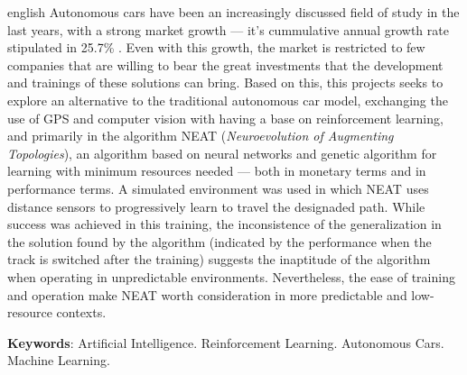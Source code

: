 \begin{resumo}[Abstract]
	\begin{otherlanguage*}{english}
		Autonomous cars have been an increasingly discussed field of study in
		the last years, with a strong market growth — it's cummulative annual
		growth rate stipulated in 25.7\% \cite{globe2022}. Even with this
		growth, the market is restricted to few companies that are willing to
		bear the great investments that the development and trainings of these
		solutions can bring. Based on this, this projects seeks to explore an
		alternative to the traditional autonomous car model, exchanging the use
		of GPS and computer vision with having a base on reinforcement
		learning, and primarily in the algorithm NEAT (\textit{Neuroevolution
		of Augmenting Topologies}), an algorithm based on neural networks and
		genetic algorithm for learning with minimum resources needed — both in
		monetary terms and in performance terms. A simulated environment was
		used in which NEAT uses distance sensors to progressively learn to
		travel the designaded path. While success was achieved in this
		training, the inconsistence of the generalization in the solution found
		by the algorithm (indicated by the performance when the track is
		switched after the training) suggests the inaptitude of the algorithm
		when operating in unpredictable environments. Nevertheless, the ease of
		training and operation make NEAT worth consideration in more
		predictable and low-resource contexts.

        \vspace{\onelineskip}

        \noindent 
        \textbf{Keywords}: Artificial Intelligence. Reinforcement Learning. Autonomous Cars. Machine Learning.
    \end{otherlanguage*}
\end{resumo}
